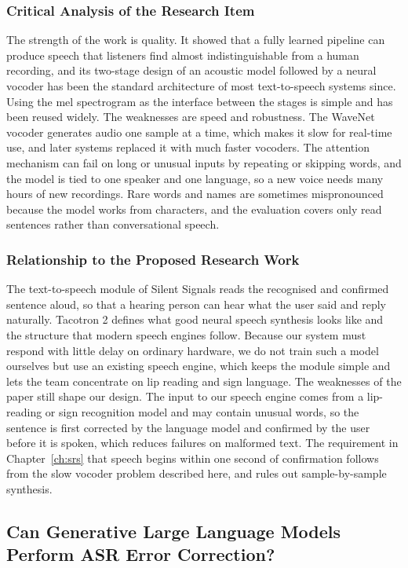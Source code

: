 \documentclass{FastFyp}
\begin{document}
\subsubsection*{Critical Analysis of the Research Item}
The strength of the work is quality. It showed that a fully learned pipeline can produce speech that listeners find almost indistinguishable from a human recording, and its two-stage design of an acoustic model followed by a neural vocoder has been the standard architecture of most text-to-speech systems since. Using the mel spectrogram as the interface between the stages is simple and has been reused widely. The weaknesses are speed and robustness. The WaveNet vocoder generates audio one sample at a time, which makes it slow for real-time use, and later systems replaced it with much faster vocoders. The attention mechanism can fail on long or unusual inputs by repeating or skipping words, and the model is tied to one speaker and one language, so a new voice needs many hours of new recordings. Rare words and names are sometimes mispronounced because the model works from characters, and the evaluation covers only read sentences rather than conversational speech.

\subsubsection*{Relationship to the Proposed Research Work}
The text-to-speech module of Silent Signals reads the recognised and confirmed sentence aloud, so that a hearing person can hear what the user said and reply naturally. Tacotron 2 \cite{shen2018tacotron2} defines what good neural speech synthesis looks like and the structure that modern speech engines follow. Because our system must respond with little delay on ordinary hardware, we do not train such a model ourselves but use an existing speech engine, which keeps the module simple and lets the team concentrate on lip reading and sign language. The weaknesses of the paper still shape our design. The input to our speech engine comes from a lip-reading or sign recognition model and may contain unusual words, so the sentence is first corrected by the language model and confirmed by the user before it is spoken, which reduces failures on malformed text. The requirement in Chapter~\ref{ch:srs} that speech begins within one second of confirmation follows from the slow vocoder problem described here, and rules out sample-by-sample synthesis.

\subsection{Can Generative Large Language Models Perform ASR Error Correction?}
\end{document}
